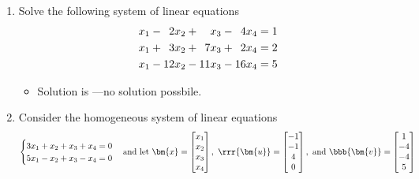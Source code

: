 \documentclass[basic]{inVerba-notes}
\begin{document}
\begin{enumerate}
\item Solve the following system of linear equations
\begin{align*}
  x_1 - \hphantom{2}2x_2 + \hphantom{22}x_3 - \hphantom{2}4x_4  &= 1 \\
  x_1 + \hphantom{2}3x_2 + \hphantom{2}7x_3 + \hphantom{2}2x_4 &= 2 \\
  x_1 - 12x_2 - 11x_3 - 16x_4        &= 5 \\
\end{align*}
\vspace*{-40pt}
\vspace*{-18pt}
\begin{itemize}\color{text}
  \item Solution is ---no solution possbile.
\end{itemize}

\newpage

\item Consider the homogeneous system of linear equations
\[%
\begin{cases}
  3x_1 + x_2  + x_3 + x_4 = 0 \\
  5x_1 - x_2  + x_3 - x_4 = 0
\end{cases} 
\text{and let}~
\bm{x} = \begin{bmatrix} x_1 \\ x_2 \\ x_3 \\ x_4\end{bmatrix},~
\rrr{\bm{u}} = \begin{bmatrix} -1 \\ -1 \\ 4 \\ 0\end{bmatrix},~
\text{and}~\bbb{\bm{v}} = \begin{bmatrix} 1 \\ -4 \\ -4 \\ 5\end{bmatrix} 
\]%
\vspace{-5pt}


\end{enumerate}
\end{document}
